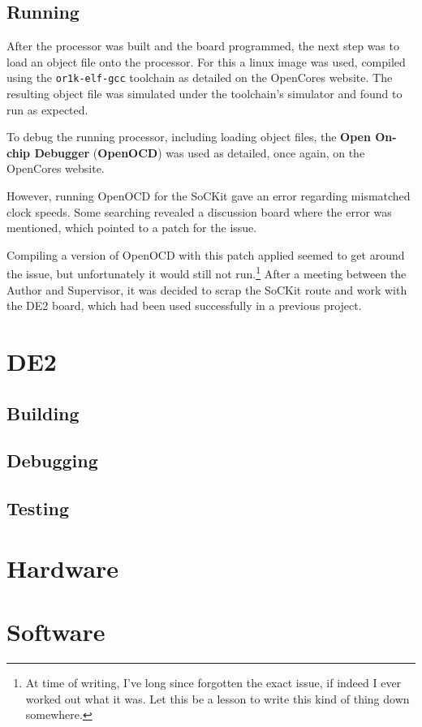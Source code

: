 \subsection{Running}
After the processor was built and the board programmed, the next step was to load an object file onto the processor. For this a linux image was used, compiled using the \verb|or1k-elf-gcc| toolchain as detailed on the OpenCores website\cite{or1k-linux}. The resulting object file was simulated under the toolchain's simulator and found to run as expected.

To debug the running processor, including loading object files, the \textbf{Open On-chip Debugger} (\textbf{OpenOCD}) was used as detailed, once again, on the OpenCores website\cite{or1k-openocd}.

However, running OpenOCD for the SoCKit gave an error regarding mismatched clock speeds. Some searching revealed a discussion board\cite{openocd-sockit} where the error was mentioned, which pointed to a patch for the issue\cite{openocd-fix}.

Compiling a version of OpenOCD with this patch applied seemed to get around the issue, but unfortunately it would still not run.\footnote{At time of writing, I've long since forgotten the exact issue, if indeed I ever worked out what it was. Let this be a lesson to write this kind of thing down somewhere.} After a meeting between the Author and Supervisor, it was decided to scrap the SoCKit route and work with the DE2 board, which had been used successfully in a previous project.

\section{DE2}
\subsection{Building}
\subsection{Debugging}
\subsection{Testing}
\section{Hardware}
\section{Software}